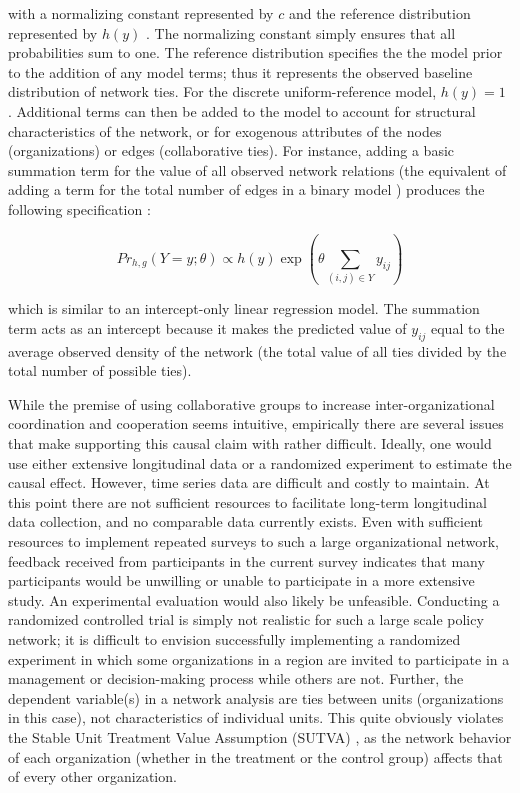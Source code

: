 \documentclass[12pt,a4paper,titlepage]{article}
\begin{document}
with a normalizing constant represented by $c$ and the reference distribution represented by $h(y)$ \parencite{krivitsky2013}. The normalizing constant simply ensures that all probabilities sum to one. The reference distribution specifies the the model prior to the addition of any model terms; thus it represents the observed baseline distribution of network ties. For the discrete uniform-reference model, $h(y) = 1$ \parencite{krivitsky2012}. Additional terms can then be added to the model to account for structural characteristics of the network, or for exogenous attributes of the nodes (organizations) or edges (collaborative ties). For instance, adding a basic summation term for the value of all observed network relations (the equivalent of adding a term for the total number of edges in a binary model \textcite{wyatt2010}) produces the following specification \parencite{krivitsky2013}:

\begin{equation}
Pr_{h,g} (Y = y; \theta) \propto h(y) \exp(\theta \sum_{(i,j) \in Y} y_{ij})
\label{eq:Term}
\end{equation}

which is similar to an intercept-only linear regression model. The summation term acts as an intercept because it makes the predicted value of $y_{ij}$ equal to the average observed density of the network (the total value of all ties divided by the total number of possible ties).

While the premise of using collaborative groups to increase inter-organizational coordination and cooperation seems intuitive, empirically there are several issues that make supporting this causal claim with rather difficult. Ideally, one would use either extensive longitudinal data or a randomized experiment to estimate the causal effect. However, time series data are difficult and costly to maintain. At this point there are not sufficient resources to facilitate long-term longitudinal data collection, and no comparable data currently exists. Even with sufficient resources to implement repeated surveys to such a large organizational network, feedback received from participants in the current survey indicates that many participants would be unwilling or unable to participate in a more extensive study. An experimental evaluation would also likely be unfeasible. Conducting a randomized controlled trial is simply not realistic for such a large scale policy network; it is difficult to envision successfully implementing a randomized experiment in which some organizations in a region are invited to participate in a management or decision-making process while others are not. Further, the dependent variable(s) in a network analysis are ties between units (organizations in this case), not characteristics of individual units. This quite obviously violates the Stable Unit Treatment Value Assumption (SUTVA) \parencite{rubin1986, pearl2000}, as the network behavior of each organization (whether in the treatment or the control group) affects that of every other organization.
\end{document}
